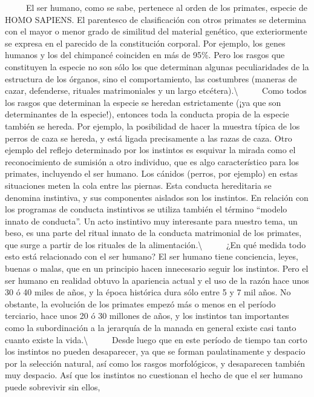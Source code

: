 ~ ~ ~ El ser humano, como se sabe, pertenece al orden de los primates,
especie de HOMO SAPIENS. El parentesco de clasificación con otros
primates se determina con el mayor o menor grado de similitud del
material genético, que exteriormente se expresa en el parecido de la
constitución corporal. Por ejemplo, los genes humanos y los del
chimpancé coinciden en más de 95\%. Pero los rasgos que constituyen la
especie no son sólo los que determinan algunas peculiaridades de la
estructura de los órganos, sino el comportamiento, las costumbres
(maneras de cazar, defenderse, rituales matrimoniales y un largo
etcétera).\textbackslash{} ~ ~ ~ Como todos los rasgos que determinan la
especie se heredan estrictamente (¡ya que son determinantes de la
especie!), entonces toda la conducta propia de la especie también se
hereda. Por ejemplo, la posibilidad de hacer la muestra típica de los
perros de caza se hereda, y está ligada precisamente a las razas de
caza. Otro ejemplo del reflejo determinado por los instintos es esquivar
la mirada como el reconocimiento de sumisión a otro individuo, que es
algo característico para los primates, incluyendo el ser humano. Los
cánidos (perros, por ejemplo) en estas situaciones meten la cola entre
las piernas. Esta conducta hereditaria se denomina instintiva, y sus
componentes aislados son los instintos. En relación con los programas de
conducta instintivos se utiliza también el término ``modelo innato de
conducta''. Un acto instintivo muy interesante para nuestro tema, un
beso, es una parte del ritual innato de la conducta matrimonial de los
primates, que surge a partir de los rituales de la
alimentación.\textbackslash{} ~ ~ ~ ¿En qué medida todo esto está
relacionado con el ser humano? El ser humano tiene conciencia, leyes,
buenas o malas, que en un principio hacen innecesario seguir los
instintos. Pero el ser humano en realidad obtuvo la apariencia actual y
el uso de la razón hace unos 30 ó 40 miles de años, y la época histórica
dura sólo entre 5 y 7 mil años. No obstante, la evolución de los
primates empezó más o menos en el período terciario, hace unos 20 ó 30
millones de años, y los instintos tan importantes como la subordinación
a la jerarquía de la manada en general existe casi tanto cuanto existe
la vida.\textbackslash{} ~ ~ ~ Desde luego que en este período de tiempo
tan corto los instintos no pueden desaparecer, ya que se forman
paulatinamente y despacio por la selección natural, así como los rasgos
morfológicos, y desaparecen también muy despacio. Así que los instintos
no cuestionan el hecho de que el ser humano puede sobrevivir sin ellos,
